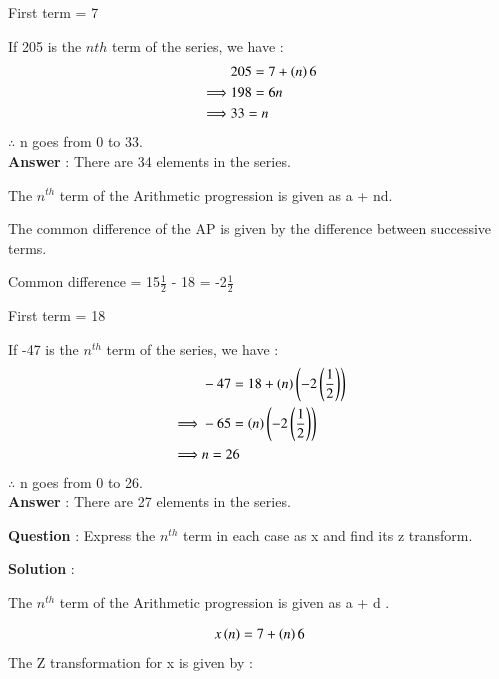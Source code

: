 \documentclass[journal,12pt,twocolumn]{IEEEtran}
\theoremstyle{remark}
\begin{document}
First term  = 7

\vspace{4mm}

If 205 is the $n{th}$ term of the series, we have :
\begin{align}
&205 = 7 + \left(n\right)6\\ 
\implies&  198 = 6n\\
\implies&  33 = n
\end{align}
$\therefore$ n goes from 0 to 33.\\
\large\textbf{Answer} : \normalsize There are 34 elements in the series.

\vspace{4mm}

\textbf{} The $n^{th}$ term of the Arithmetic progression is given as a + nd.

The common difference of the AP is given by the difference between successive terms.

\vspace{4mm}

Common difference  = 15$\frac{1}{2}$ - 18 = -2$\frac{1}{2}$

First term  = 18

\vspace{4mm}

If -47 is the $n^{th}$ term of the series, we have :
\begin{align}
&-47 = 18 + \left(n\right)\left(-2\left(\frac{1}{2}\right)\right)\\ 
\implies& -65 = \left(n\right)\left(-2\left(\frac{1}{2}\right)\right)\\
\implies& n = 26
\end{align} 
$\therefore$ n goes from 0 to 26.\\
\large\textbf{Answer} : \normalsize There are 27 elements in the series.

\vspace{4mm}

\large\textbf{Question} : \normalsize Express the $n^{th}$ term in each case as x and find its z transform.

\vspace{4mm}

\large\textbf{Solution} : \normalsize

\vspace{4mm}

\textbf{} The $n^{th}$ term of the Arithmetic progression is given as a + d .

\begin{align}
x\left(n\right) = 7 + \left(n\right)6
\end{align}
The Z transformation for x is given by :
\end{document}
